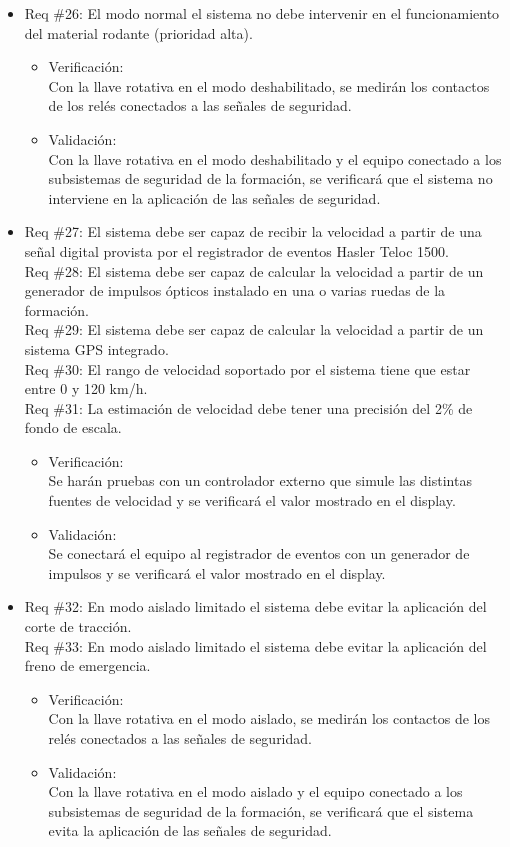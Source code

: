 \documentclass[11pt]{charter}
\begin{document}
\begin{itemize}
\item Req \#26: El modo normal el sistema no debe intervenir en el funcionamiento del material rodante (prioridad alta).
\begin{itemize}
  \item Verificación:\\
  Con la llave rotativa en el modo deshabilitado, se medirán los contactos de los relés conectados a las señales de seguridad.
  \item Validación:\\
  Con la llave rotativa en el modo deshabilitado y el equipo conectado a los subsistemas de seguridad de la formación, se verificará que el sistema no interviene en la aplicación de las señales de seguridad.
\end{itemize}

\item Req \#27: El sistema debe ser capaz de recibir la velocidad a partir de una señal digital provista por el registrador de eventos Hasler Teloc 1500. \\
Req \#28: El sistema debe ser capaz de calcular la velocidad a partir de un generador de impulsos ópticos instalado en una o varias ruedas de la formación. \\
Req \#29: El sistema debe ser capaz de calcular la velocidad a partir de un sistema GPS integrado. \\
Req \#30: El rango de velocidad soportado por el sistema tiene que estar entre 0 y 120 km/h. \\
Req \#31: La estimación de velocidad debe tener una precisión del 2\% de fondo de escala.
\begin{itemize}
  \item Verificación:\\
  Se harán pruebas con un controlador externo que simule las distintas fuentes de velocidad y se verificará el valor mostrado en el display.
  \item Validación:\\
  Se conectará el equipo al registrador de eventos con un generador de impulsos y se verificará el valor mostrado en el display.
\end{itemize}

\newpage

\item Req \#32: En modo aislado limitado el sistema debe evitar la aplicación del corte de tracción. \\
Req \#33: En modo aislado limitado el sistema debe evitar la aplicación del freno de emergencia.
\begin{itemize}
  \item Verificación:\\
  Con la llave rotativa en el modo aislado, se medirán los contactos de los relés conectados a las señales de seguridad.
  \item Validación:\\
  Con la llave rotativa en el modo aislado y el equipo conectado a los subsistemas de seguridad de la formación, se verificará que el sistema evita la aplicación de las señales de seguridad.
\end{itemize}


\end{itemize}
\end{document}
